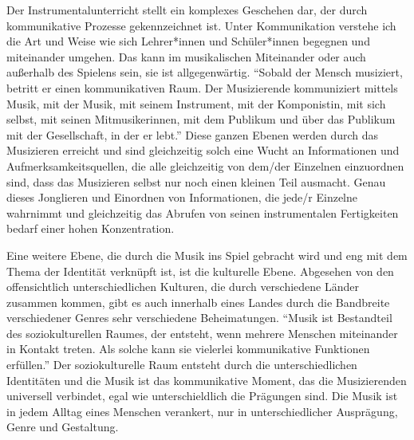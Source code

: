 Der Instrumentalunterricht stellt ein komplexes Geschehen dar, der durch
kommunikative Prozesse gekennzeichnet ist. Unter Kommunikation verstehe ich die
Art und Weise wie sich Lehrer*innen und Schüler*innen begegnen und miteinander
umgehen. Das kann im musikalischen Miteinander oder auch außerhalb des Spielens
sein, sie ist allgegenwärtig. \enquote{Sobald der Mensch musiziert, betritt er
einen kommunikativen Raum. Der Musizierende kommuniziert mittels Musik, mit der
Musik, mit seinem Instrument, mit der Komponistin, mit sich selbst, mit seinen
Mitmusikerinnen, mit dem Publikum und über das Publikum mit der Gesellschaft, in
der er lebt.} \autocite[56]{doerne:umfassend_musizieren} Diese ganzen Ebenen
werden durch das Musizieren erreicht und sind gleichzeitig solch eine Wucht an
Informationen und Aufmerksamkeitsquellen, die alle gleichzeitig von dem/der
Einzelnen einzuordnen sind, dass das Musizieren selbst nur noch einen kleinen
Teil ausmacht. Genau dieses Jonglieren und Einordnen von Informationen, die
jede/r Einzelne wahrnimmt und gleichzeitig das Abrufen von seinen instrumentalen
Fertigkeiten bedarf einer hohen Konzentration.

Eine weitere Ebene,
die durch die Musik ins Spiel gebracht wird und eng mit dem Thema der Identität
verknüpft ist, ist die kulturelle Ebene. Abgesehen von den offensichtlich
unterschiedlichen Kulturen, die durch verschiedene Länder zusammen kommen, gibt
es auch innerhalb eines Landes durch die Bandbreite verschiedener Genres sehr
verschiedene Beheimatungen. \enquote{Musik ist Bestandteil des soziokulturellen
Raumes, der entsteht, wenn mehrere Menschen miteinander in Kontakt treten. Als
solche kann sie vielerlei kommunikative Funktionen erfüllen.}
\autocite[56]{doerne:umfassend_musizieren} Der soziokulturelle Raum entsteht
durch die unterschiedlichen Identitäten und die Musik ist das kommunikative
Moment, das die Musizierenden universell verbindet, egal wie unterschieldlich
die Prägungen sind. Die Musik ist in jedem Alltag eines Menschen verankert, nur
in unterschiedlicher Ausprägung, Genre und Gestaltung.


